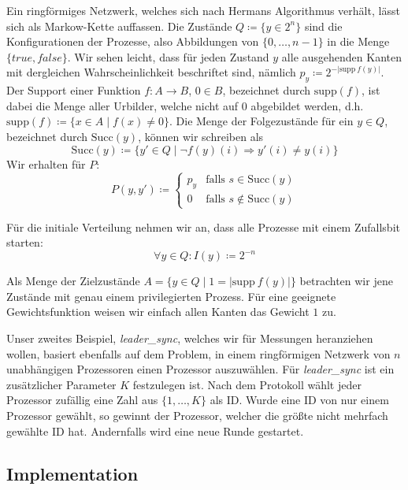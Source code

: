 \documentclass[a4paper]{article}
\newcommand{\mc}{Markow-Kette}
\theoremstyle{nonumberplain}
\begin{document}
Ein ringförmiges Netzwerk, welches sich nach Hermans Algorithmus verhält, lässt sich als \mc{} \mcex{} auffassen. Die Zustände $Q \coloneqq \{ y \in 2^n\}$ sind die Konfigurationen der Prozesse, also Abbildungen von $\{0, \dots , n-1\}$ in die Menge $\{true, false\}$. Wir sehen leicht, dass für jeden Zustand $y$ alle ausgehenden Kanten mit dergleichen Wahrscheinlichkeit beschriftet sind, nämlich $p_y \coloneqq 2^{-|\mathrm{supp}\>f(y)|}$. Der Support einer Funktion $f : A \to B$, $0\in B$, bezeichnet durch $\mathrm{supp}(f)$, ist dabei die Menge aller Urbilder, welche nicht auf $0$ abgebildet werden, d.h. $\mathrm{supp}(f)\coloneqq\{x \in A \mid f(x) \neq 0\}$. Die Menge der Folgezustände für ein $y \in Q$, bezeichnet durch $\mathrm{Succ}(y)$, können wir schreiben als
\[
	\mathrm{Succ}(y) \coloneqq \{ y' \in Q \mid \neg f(y)(i) \Rightarrow y'(i) \neq y(i) \}
\]
Wir erhalten für $P$:
\begin{equation}
	P(y,y') \coloneqq \begin{cases}
		p_y & \text{falls } s\in \mathrm{Succ}(y)\\
		0 & \text{falls } s\notin \mathrm{Succ}(y)
	\end{cases}
\end{equation}

Für die initiale Verteilung nehmen wir an, dass alle Prozesse mit einem Zufallsbit starten:
\begin{equation*}
	\forall y \in Q : I(y) \coloneqq 2^{-n}
\end{equation*}

Als Menge der Zielzustände  $A = \{ y \in Q \mid 1 = |\mathrm{supp}\>f(y)|\}$ betrachten wir jene Zustände mit genau einem privilegierten Prozess. Für eine geeignete Gewichtsfunktion weisen wir einfach allen Kanten das Gewicht $1$ zu.

\bigskip
Unser zweites Beispiel, \textit{leader\_sync}, welches wir für Messungen heranziehen wollen, basiert ebenfalls auf dem Problem, in einem ringförmigen Netzwerk von $n$ unabhängigen Prozessoren einen Prozessor auszuwählen. Für \textit{leader\_sync} ist ein zusätzlicher Parameter $K$ festzulegen ist. Nach dem Protokoll wählt jeder Prozessor zufällig eine Zahl aus $\{1, \dots , K\}$ als ID. Wurde eine ID von nur einem Prozessor gewählt, so gewinnt der Prozessor, welcher die größte nicht mehrfach gewählte ID hat. Andernfalls wird eine neue Runde gestartet.

\subsection{Implementation}
\end{document}
